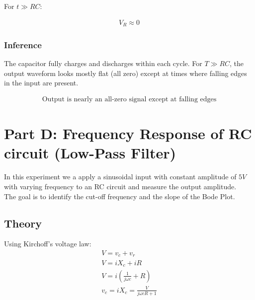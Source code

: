 \documentclass{scrreprt}
\begin{document}
For $t \gg RC$:

\begin{align}
V_R \approx 0
\end{align}

\subsubsection*{Inference}

The capacitor fully charges and discharges within each cycle. For $T \gg RC$, the output waveform looks mostly flat (all zero) except at times where falling edges in the input are present.

\begin{align}
    \boxed{\text{Output is nearly an all-zero signal except at falling edges}}
\end{align}


\section{Part D: Frequency Response of RC circuit (Low-Pass Filter)}
In this experiment we a apply a sinusoidal input with constant amplitude of $5V$ with varying frequency to an RC circuit and measure the output amplitude.\\
The goal is to identify the cut-off frequency and the slope of the Bode Plot.\\
\subsection{Theory}
Using Kirchoff's voltage law:
\begin{align}
    V=v_c+v_r \\
    V=iX_c+iR  \\
    V=i(\frac{1}{j\omega c}+R) \\
    v_c=iX_c=\frac{V}{j\omega cR+1}\\
\end{align}
\end{document}
